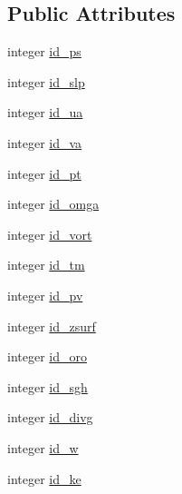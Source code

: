 \subsection*{Public Attributes}
\begin{DoxyCompactItemize}
\item 
integer \hyperlink{structfv__arrays__mod_1_1fv__diag__type_ad5e5adc5340a72ba40be7cd619389f17}{id\-\_\-ps}
\item 
integer \hyperlink{structfv__arrays__mod_1_1fv__diag__type_ae7f64969cc84bc70bb36034b6af892a0}{id\-\_\-slp}
\item 
integer \hyperlink{structfv__arrays__mod_1_1fv__diag__type_a7a4ee8c20891ff161ac67c619f2dd130}{id\-\_\-ua}
\item 
integer \hyperlink{structfv__arrays__mod_1_1fv__diag__type_a66ece8760225174cdd8a77b9fd5130ad}{id\-\_\-va}
\item 
integer \hyperlink{structfv__arrays__mod_1_1fv__diag__type_afcbabab8aba30345a735324804f20473}{id\-\_\-pt}
\item 
integer \hyperlink{structfv__arrays__mod_1_1fv__diag__type_a099c1591bd31eabe7488f23403b55111}{id\-\_\-omga}
\item 
integer \hyperlink{structfv__arrays__mod_1_1fv__diag__type_addcd934fc8d2fc611ca1fed2bd13ed29}{id\-\_\-vort}
\item 
integer \hyperlink{structfv__arrays__mod_1_1fv__diag__type_a6b7cf6f96193ee0e13156d20ef1d2450}{id\-\_\-tm}
\item 
integer \hyperlink{structfv__arrays__mod_1_1fv__diag__type_a49d1e596f9adae8460273c3b58356bce}{id\-\_\-pv}
\item 
integer \hyperlink{structfv__arrays__mod_1_1fv__diag__type_af1be4af4ae277430d4b2374cb2ebed5c}{id\-\_\-zsurf}
\item 
integer \hyperlink{structfv__arrays__mod_1_1fv__diag__type_a82afdc986149388b63e14f22dd32377f}{id\-\_\-oro}
\item 
integer \hyperlink{structfv__arrays__mod_1_1fv__diag__type_a129b8497a1a0ae956fde38d1d883f151}{id\-\_\-sgh}
\item 
integer \hyperlink{structfv__arrays__mod_1_1fv__diag__type_ad9c51936a5512e09af33275c26e51df7}{id\-\_\-divg}
\item 
integer \hyperlink{structfv__arrays__mod_1_1fv__diag__type_a4d3a07f64e34052c869b1676e850f278}{id\-\_\-w}
\item 
integer \hyperlink{structfv__arrays__mod_1_1fv__diag__type_a74b808c1e2b1f127e9336784184f6426}{id\-\_\-ke}
\item 

\end{DoxyCompactItemize}
